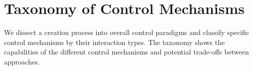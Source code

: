 

\section{Taxonomy of Control Mechanisms}
\label{sec:taxo_control_mechanism}

We dissect a creation process into overall control paradigms and classify specific control mechanisms by their interaction types. The taxonomy shows the capabilities of the different control mechanisms and potential trade-offs between approaches.  




\newcommand{\controlParamsFigWidth}{1.0}

